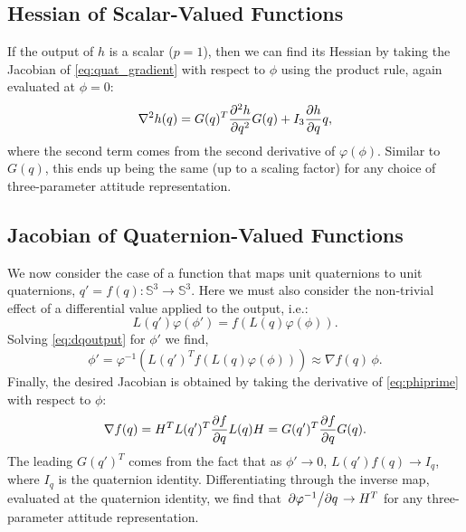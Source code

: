 \documentclass{svproc}
\newcommand{\Q}{\mathbb{S}^3}
\begin{document}
    \subsection{Hessian of Scalar-Valued Functions}
	    If the output of $h$ is a scalar ($p = 1$), then we can find its Hessian by taking the Jacobian of \eqref{eq:quat_gradient} with respect to $\phi$ using the product rule, again evaluated at $\phi = 0$:
	    \begin{equation} \label{eq:quat_hessian}
            \nabla^2 h(q) = G(q)^T \pdv[2]{h}{q} G(q) + I_3 \pdv{h}{q}q,
	    \end{equation}
	    where the second term comes from the second derivative of $\varphi(\phi)$. Similar to $G(q)$, this ends up being the same (up to a scaling factor) for any choice of three-parameter attitude representation.
	    
    \subsection{Jacobian of Quaternion-Valued Functions}
        We now consider the case of a function that maps unit quaternions to unit quaternions, $q' = f(q) : \Q \to \Q$. Here we must also consider the non-trivial effect of a differential value applied to the output, i.e.:
        \begin{equation} \label{eq:dqoutput}
            L(q') \varphi(\phi') = f(L(q)\varphi(\phi)) .
        \end{equation}
        Solving \eqref{eq:dqoutput} for $\phi'$ we find,
        \begin{equation} \label{eq:phiprime}
            \phi' = \varphi^{-1} \left( L(q')^T f(L(q)\varphi(\phi)) \right) \approx \nabla f(q) \, \phi.
        \end{equation}
        Finally, the desired Jacobian is obtained by taking the derivative of \eqref{eq:phiprime} with respect to $\phi$:
        \begin{equation} \label{eq:quat_jacobian}
            \nabla f(q) = H^T L(q')^T \pdv{f}{q} L(q) H = G(q')^T \pdv{f}{q} G(q).
        \end{equation}
        The leading $G(q')^T$ comes from the fact that as $\phi' \to 0$, $L(q') f(q) \to I_q$, where $I_q$ is the quaternion identity. Differentiating through the inverse map, evaluated at the quaternion identity, we find that $\pdv*{\varphi^{-1}}{q} \to H^T$ for any three-parameter attitude representation.
        
\end{document}
